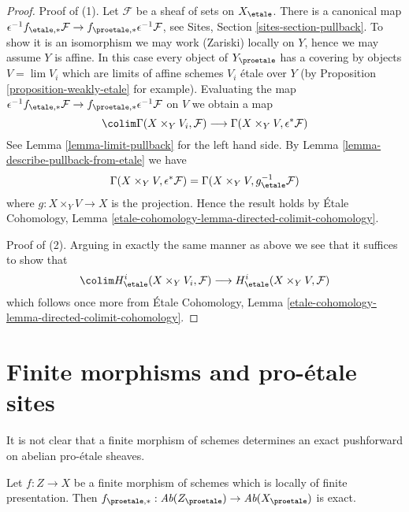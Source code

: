\begin{proof}
Proof of (1). Let $\mathcal{F}$ be a sheaf of sets on $X_\etale$. There
is a canonical map $\epsilon^{-1}f_{\etale, *}\mathcal{F} \to
f_{\proetale, *}\epsilon^{-1}\mathcal{F}$, see
Sites, Section \ref{sites-section-pullback}.
To show it is an isomorphism we may work (Zariski) locally on $Y$, hence
we may assume $Y$ is affine. In this case
every object of $Y_\proetale$ has a covering by objects $V = \lim V_i$
which are limits of affine schemes $V_i$ \'etale over $Y$ (by
Proposition \ref{proposition-weakly-etale}
for example). Evaluating the map
$\epsilon^{-1}f_{\etale, *}\mathcal{F} \to
f_{\proetale, *}\epsilon^{-1}\mathcal{F}$
on $V$ we obtain a map
$$
\colim \Gamma(X \times_Y V_i, \mathcal{F})
\longrightarrow
\Gamma(X \times_Y V, \epsilon^*\mathcal{F})
$$
See Lemma \ref{lemma-limit-pullback} for the left hand side.
By Lemma \ref{lemma-describe-pullback-from-etale} we have
$$
\Gamma(X \times_Y V, \epsilon^*\mathcal{F}) =
\Gamma(X \times_Y V, g_\etale^{-1}\mathcal{F})
$$
where $g : X \times_Y V \to X$ is the projection. Hence the result holds by
\'Etale Cohomology, Lemma
\ref{etale-cohomology-lemma-directed-colimit-cohomology}.

\medskip\noindent
Proof of (2). Arguing in exactly the same manner as above
we see that it suffices to show that
$$
\colim H^i_\etale(X \times_Y V_i, \mathcal{F})
\longrightarrow
H^i_\etale(X \times_Y V, \mathcal{F})
$$
which follows once more from \'Etale Cohomology, Lemma
\ref{etale-cohomology-lemma-directed-colimit-cohomology}.
\end{proof}







\section{Finite morphisms and pro-\'etale sites}
\label{section-finite}

\noindent
It is not clear that a finite morphism of schemes determines
an exact pushforward on abelian pro-\'etale sheaves.

\begin{lemma}
\label{lemma-finite}
Let $f : Z \to X$ be a finite morphism of schemes which is
locally of finite presentation. Then
$f_{\proetale, *} : \textit{Ab}(Z_\proetale) \to \textit{Ab}(X_\proetale)$
is exact.
\end{lemma}

